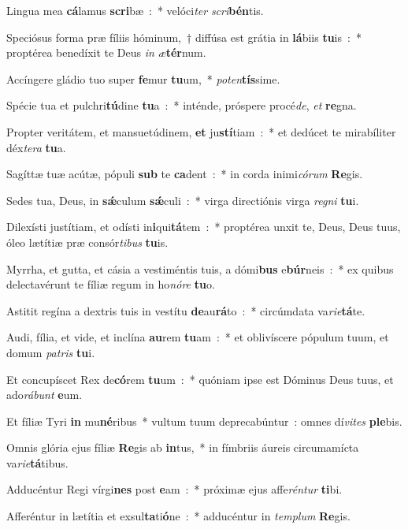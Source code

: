 \item Lingua mea \textbf{cá}lamus \textbf{scri}bæ~:~* velóci\emph{ter} \emph{scri}\textbf{bén}tis.
\item Speciósus forma præ fíliis hóminum,~† diffúsa est grátia in \textbf{lá}biis \textbf{tu}is~:~* proptérea benedíxit te Deus \emph{in} \emph{æ}\textbf{tér}num.
\item Accíngere gládio tuo super \textbf{fe}mur \textbf{tu}um,~* \emph{po}\emph{ten}\textbf{tís}sime.
\item Spécie tua et pulchri\textbf{tú}dine \textbf{tu}a~:~* inténde, próspere procé\emph{de}, \emph{et} \textbf{re}gna.
\item Propter veritátem, et mansuetúdinem, \textbf{et} ju\textbf{stí}tiam~:~* et dedúcet te mirabíliter déx\emph{te}\emph{ra} \textbf{tu}a.
\item Sagíttæ tuæ acútæ, pópuli \textbf{sub} te \textbf{ca}dent~:~* in corda inimi\emph{có}\emph{rum} \textbf{Re}gis.
\item Sedes tua, Deus, in \textbf{sǽ}culum \textbf{sǽ}culi~:~* virga directiónis virga \emph{re}\emph{gni} \textbf{tu}i.
\item Dilexísti justítiam, et odísti in\textbf{i}qui\textbf{tá}tem~:~* proptérea unxit te, Deus, Deus tuus, óleo lætítiæ præ consór\emph{ti}\emph{bus} \textbf{tu}is.
\item Myrrha, et gutta, et cásia a vestiméntis tuis, a dómi\textbf{bus} e\textbf{búr}neis~:~* ex quibus delectavérunt te fíliæ regum in ho\emph{nó}\emph{re} \textbf{tu}o.
\item Astitit regína a dextris tuis in vestítu \textbf{de}au\textbf{rá}to~:~* circúmdata va\emph{ri}\emph{e}\textbf{tá}te.
\item Audi, fília, et vide, et inclína \textbf{au}rem \textbf{tu}am~:~* et oblivíscere pópulum tuum, et domum \emph{pa}\emph{tris} \textbf{tu}i.
\item Et concupíscet Rex de\textbf{có}rem \textbf{tu}um~:~* quóniam ipse est Dóminus Deus tuus, et ado\emph{rá}\emph{bunt} \textbf{e}um.
\item Et fíliæ Tyri \textbf{in} mu\textbf{né}ribus~* vultum tuum deprecabúntur~: omnes dí\emph{vi}\emph{tes} \textbf{ple}bis.
\item Omnis glória ejus fíliæ \textbf{Re}gis ab \textbf{in}tus,~* in fímbriis áureis circumamícta va\emph{ri}\emph{e}\textbf{tá}tibus.
\item Adducéntur Regi vírgi\textbf{nes} post \textbf{e}am~:~* próximæ ejus affe\emph{rén}\emph{tur} \textbf{ti}bi.
\item Afferéntur in lætítia et exsul\textbf{ta}ti\textbf{ó}ne~:~* adducéntur in \emph{tem}\emph{plum} \textbf{Re}gis.
